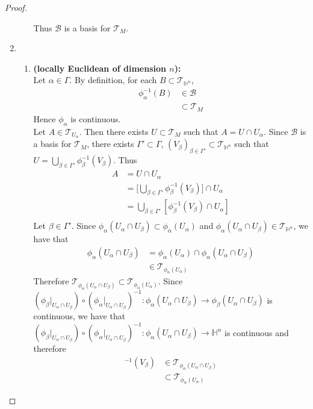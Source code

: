 \documentclass{book}
\theoremstyle{definition}
\newcommand{\al}{\alpha}
\newcommand{\be}{\beta}
\newcommand{\Gam}{\Gamma}
\renewcommand{\H}{\mathbb{H}}
\newcommand{\MB}{\mathcal{B}}
\newcommand{\MT}{\mathcal{T}}
\DeclareMathOperator*{\0}{\mbf{0}}
\DeclareMathOperator*{\1}{\mbf{1}}
\newcommand{\tbf}[1]{\textbf{#1}}
\begin{document}
\begin{proof}
\begin{enumerate}
\begin{itemize}
			Thus $\MB$ is a basis for $\MT_M$.
		\end{itemize}
		\item 
		\begin{enumerate}
			\item \tbf{(locally Euclidean of dimension $n$):}\\
			Let $\al \in \Gam$. By definition, for each $B \subset \MT_{\H^n}$, 
			\begin{align*}
				\phi_{\al}^{-1}(B) 
				& \in \MB \\
				& \subset \MT_M
			\end{align*}
			Hence $\phi_{\al}$ is continuous. \\
			Let $A \in \MT_{U_{\al}}$. Then there exists $U \subset \MT_M$ such that $A = U \cap U_{\al}$. Since $\MB$ is a basis for $\MT_M$, there exists $\Gam' \subset \Gam$, $(V_{\be})_{\be \in \Gam'} \subset \MT_{\H^n}$ such that $U = \bigcup_{ \be \in \Gam'} \phi_{\be}^{-1}(V_{\be})$. Thus 
			\begin{align*}
				A
				& = U \cap U_{\al} \\
				& = \bigg[\bigcup_{\be \in \Gam'} \phi_{\be}^{-1}(V_{\be}) \bigg] \cap U_{\al} \\ 
				& = \bigcup_{\be \in \Gam'} [\phi_{\be}^{-1}(V_{\be}) \cap U_{\al}] \\
			\end{align*} 
			Let $\be \in \Gam'$. Since $\phi_{\al}(U_{\al} \cap U_{\be}) \subset \phi_{\al}(U_{\al})$ and $\phi_{\al}(U_{\al} \cap U_{\be}) \in \MT_{\H^n}$, we have that
			\begin{align*}
				\phi_{\al}(U_{\al} \cap U_{\be})
				& = \phi_{\al}(U_{\al}) \cap \phi_{\al}(U_{\al} \cap U_{\be}) \\
				& \in \MT_{\phi_{\al}(U_{\al})}
			\end{align*}
			Therefore $\MT_{\phi_{\al}(U_{\al} \cap U_{\be})} \subset \MT_{\phi_{\al}(U_{\al})}$. Since $(\phi_{\be}|_{U_{\al} \cap U_{\be}}) \circ (\phi_{\al}|_{U_{\al} \cap U_{\be}})^{-1}: \phi_{\al}(U_{\al} \cap U_{\be}) \rightarrow \phi_{\be}(U_{\al} \cap U_{\be})$ is continuous, we have that $(\phi_{\be}|_{U_{\al} \cap U_{\be}}) \circ (\phi_{\al}|_{U_{\al} \cap U_{\be}})^{-1}: \phi_{\al}(U_{\al} \cap U_{\be}) \rightarrow \H^n$
			is continuous and therefore 
			\begin{align*}
				[(\phi_{\be}|_{U_{\al} \cap U_{\be}}) \circ (\phi_{\al}|_{U_{\al} \cap U_{\be}})^{-1}]^{-1}(V_{\be}) 
				& \in \MT_{\phi_{\al}(U_{\al} \cap U_{\be})} \\
				& \subset \MT_{\phi_{\al}(U_{\al})}

\end{align*}
\end{enumerate}
\end{enumerate}
\end{proof}
\end{document}
